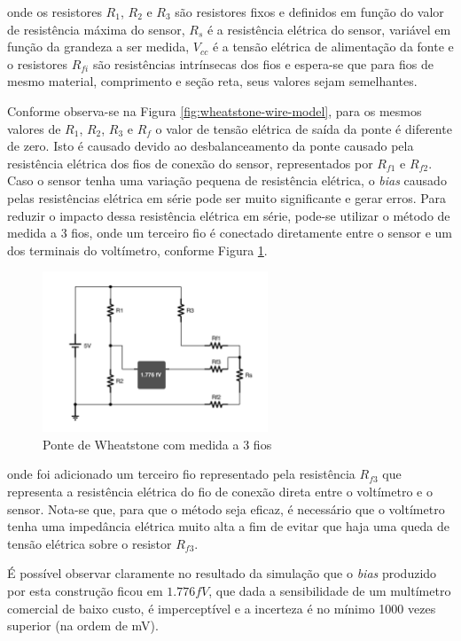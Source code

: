 \documentclass[a4paper]{instrumentacao}
\begin{document}
\noindent onde os resistores $R_1$, $R_2$ e $R_3$ são resistores fixos e definidos em função do valor de resistência máxima do sensor, $R_s$ é a resistência elétrica do sensor, variável em função da grandeza a ser medida, $V_{cc}$ é a tensão elétrica de alimentação da fonte e o resistores $R_{fi}$ são resistências intrínsecas dos fios e espera-se que para fios de mesmo material, comprimento e seção reta, seus valores sejam semelhantes.

Conforme observa-se na Figura \ref{fig:wheatstone-wire-model}, para os mesmos valores de $R_1$, $R_2$, $R_3$ e $R_f$ o valor de tensão elétrica de saída da ponte é diferente de zero. Isto é causado devido ao desbalanceamento da ponte causado pela resistência elétrica dos fios de conexão do sensor, representados por $R_{f1}$ e $R_{f2}$. Caso o sensor tenha uma variação pequena de resistência elétrica, o \textit{bias} causado pelas resistências elétrica em série pode ser muito significante e gerar erros. Para reduzir o impacto dessa resistência elétrica em série, pode-se utilizar o método de medida a 3 fios, onde um terceiro fio é conectado diretamente entre o sensor e um dos terminais do voltímetro, conforme Figura \ref{fig:wheatstone-3wire}.

\begin{figure}[H]
\centering
\includegraphics[width=0.6\textwidth]{Wheatstone-Bridge-3Wire.pdf}
\caption{Ponte de Wheatstone com medida a 3 fios}
\label{fig:wheatstone-3wire}
\end{figure}

\noindent onde foi adicionado um terceiro fio representado pela resistência $R_{f3}$ que representa a resistência elétrica do fio de conexão direta entre o voltímetro e o sensor. Nota-se que, para que o método seja eficaz, é necessário que o voltímetro tenha uma impedância elétrica muito alta a fim de evitar que haja uma queda de tensão elétrica sobre o resistor $R_{f3}$.

É possível observar claramente no resultado da simulação que o \textit{bias} produzido por esta construção ficou em $1.776 fV$, que dada a sensibilidade de um multímetro comercial de baixo custo, é imperceptível e a incerteza é no mínimo 1000 vezes superior (na ordem de mV).
\end{document}
